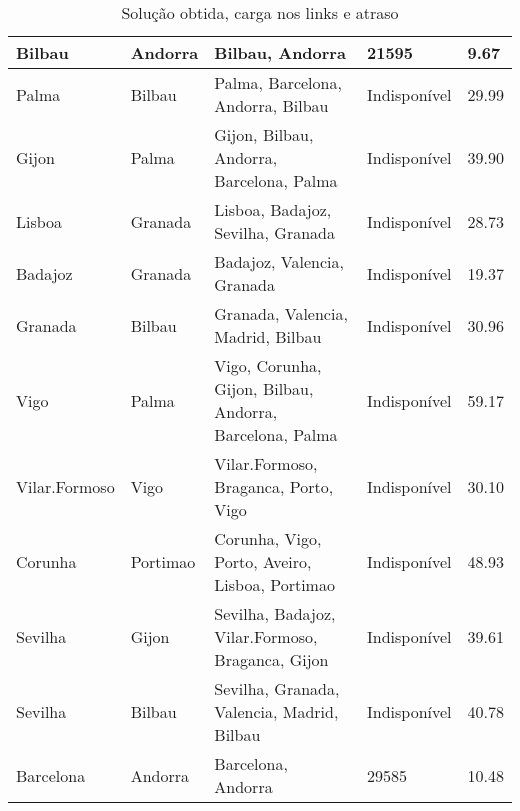 \begin{table}[!htb]
{\begin{tabular}{|l|l|l|l|l|}
Bilbau & Andorra & Bilbau, Andorra & 21595 & 9.67 \\ \hline
Palma & Bilbau & Palma, Barcelona, Andorra, Bilbau & Indisponível & 29.99 \\ \hline
Gijon & Palma & Gijon, Bilbau, Andorra, Barcelona, Palma & Indisponível & 39.90 \\ \hline
Lisboa & Granada & Lisboa, Badajoz, Sevilha, Granada & Indisponível & 28.73 \\ \hline
Badajoz & Granada & Badajoz, Valencia, Granada & Indisponível & 19.37 \\ \hline
Granada & Bilbau & Granada, Valencia, Madrid, Bilbau & Indisponível & 30.96 \\ \hline
Vigo & Palma & Vigo, Corunha, Gijon, Bilbau, Andorra, Barcelona, Palma & Indisponível & 59.17 \\ \hline
Vilar.Formoso & Vigo & Vilar.Formoso, Braganca, Porto, Vigo & Indisponível & 30.10 \\ \hline
Corunha & Portimao & Corunha, Vigo, Porto, Aveiro, Lisboa, Portimao & Indisponível & 48.93 \\ \hline
Sevilha & Gijon & Sevilha, Badajoz, Vilar.Formoso, Braganca, Gijon & Indisponível & 39.61 \\ \hline
Sevilha & Bilbau & Sevilha, Granada, Valencia, Madrid, Bilbau & Indisponível & 40.78 \\ \hline
Barcelona & Andorra & Barcelona, Andorra & 29585 & 10.48 \\ \hline
\end{tabular}}
\caption[]{Solução obtida, carga nos links e atraso}
\end{table}

